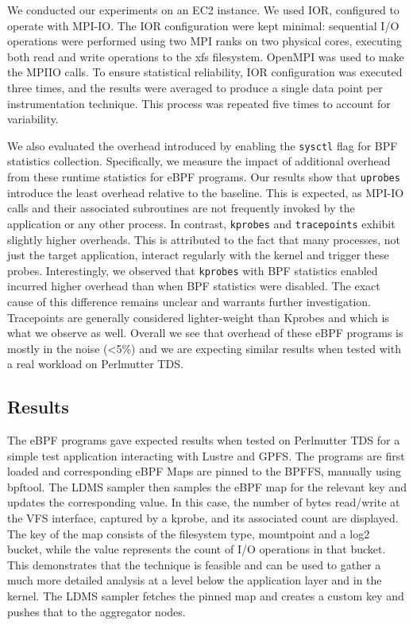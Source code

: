 \documentclass[sigconf]{acmart}
\begin{document}
We conducted our experiments on an EC2 instance. We used IOR, configured to operate with MPI-IO. The IOR configuration were kept minimal: sequential I/O operations were performed using two MPI ranks on two physical cores, executing both read and write operations to the xfs filesystem. OpenMPI was used to make the MPIIO calls. To ensure statistical reliability, IOR configuration was executed three times, and the results were averaged to produce a single data point per instrumentation technique. This process was repeated five times to account for variability.

We also evaluated the overhead introduced by enabling the \texttt{sysctl} flag for BPF statistics collection. Specifically, we measure the impact of additional overhead from these runtime statistics for eBPF programs. Our results show that \texttt{uprobes} introduce the least overhead relative to the baseline. This is expected, as MPI-IO calls and their associated subroutines are not frequently invoked by the application or any other process. In contrast, \texttt{kprobes} and \texttt{tracepoints} exhibit slightly higher overheads. This is attributed to the fact that many processes, not just the target application, interact regularly with the kernel and trigger these probes. Interestingly, we observed that \texttt{kprobes} with BPF statistics enabled incurred higher overhead than when BPF statistics were disabled. The exact cause of this difference remains unclear and warrants further investigation. Tracepoints are generally considered lighter-weight than Kprobes \cite{evans_linux_tracing} and which is what we observe as well. Overall we see that overhead of these eBPF programs is mostly in the noise (<5\%) and we are expecting similar results when tested with a real workload on Perlmutter TDS.

\subsection{Results}
The eBPF programs gave expected results when tested on Perlmutter TDS for a simple test application interacting with Lustre and GPFS. The programs are first loaded and corresponding eBPF Maps are pinned to the BPFFS, manually using bpftool. The LDMS sampler then samples the eBPF map for the relevant key and updates the corresponding value. In this case, the number of bytes read/write at the VFS interface, captured by a kprobe, and its associated count are displayed. The key of the map consists of the filesystem type, mountpoint and a log2 bucket, while the value represents the count of I/O operations in that bucket. This demonstrates that the technique is feasible and can be used to gather a much more detailed analysis at a level below the application layer and in the kernel. The LDMS sampler fetches the pinned map and creates a custom key and pushes that to the aggregator nodes.
\end{document}
